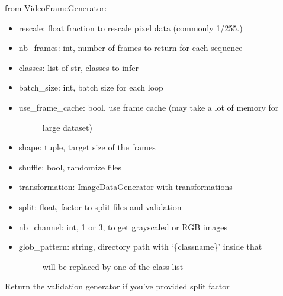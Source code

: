 \documentclass[letterpaper,10pt,english]{sphinxmanual}
\begin{document}
\begin{fulllineitems}
from VideoFrameGenerator:
\begin{itemize}
\item {} 
rescale: float fraction to rescale pixel data (commonly 1/255.)

\item {} 
nb\_frames: int, number of frames to return for each sequence

\item {} 
classes: list of str, classes to infer

\item {} 
batch\_size: int, batch size for each loop

\item {} \begin{description}
\item[{use\_frame\_cache: bool, use frame cache (may take a lot of memory for}] \leavevmode
large dataset)

\end{description}

\item {} 
shape: tuple, target size of the frames

\item {} 
shuffle: bool, randomize files

\item {} 
transformation: ImageDataGenerator with transformations

\item {} 
split: float, factor to split files and validation

\item {} 
nb\_channel: int, 1 or 3, to get grayscaled or RGB images

\item {} \begin{description}
\item[{glob\_pattern: string, directory path with ‘\{classname\}’ inside that}] \leavevmode
will be replaced by one of the class list

\end{description}

\end{itemize}

\begin{fulllineitems}
\label{\detokenize{index:keras_video.sliding.SlidingFrameGenerator.get_validation_generator}}
Return the validation generator if you’ve provided split factor


\end{fulllineitems}
\end{fulllineitems}
\end{document}
